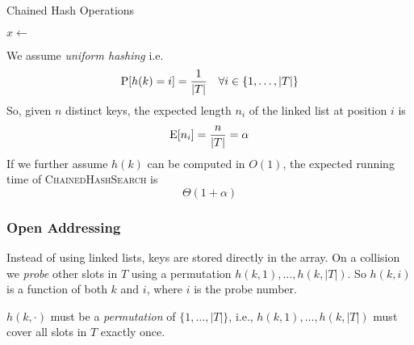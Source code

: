 \begin{figure}[htb]
\end{figure}



\begin{algorithm}[htb]
  \caption{Chained Hash Operations}
  \label{alg:chained_hash}
  \begin{algorithmic}[1]
      \State {}
    \EndFunction
      \State \Return {}
    \EndFunction
      \State $x \gets$ 
       \State {} \EndIf
    \EndFunction
  \end{algorithmic}
\end{algorithm}

We assume \emph{uniform hashing} i.e.
\[
\operatorname{P}[h(k) = i] = \frac{1}{|T|} \quad \forall i \in \{1,\dots,|T|\}
\]
So, given \(n\) distinct keys, the expected length \(n_i\) of the linked list at position \(i\) is
\[
\operatorname{E}[n_i] = \frac{n}{|T|} = \alpha
\]
If we further assume \(h(k)\) can be computed in \(O(1)\), the expected running time of \textsc{ChainedHashSearch} is
\[\boxed{
\Theta(1+\alpha)
}\]

\subsubsection{Open Addressing}

Instead of using linked lists, keys are stored directly in the array. 
On a collision we \emph{probe} other slots in \(T\) using a permutation \(h(k,1),\dots,h(k,|T|)\). 
So \(h(k,i)\) is a function of both \(k\) and \(i\), where \(i\) is the probe number.

\(h(k,\cdot)\) must be a \emph{permutation} of \(\{1,\dots,|T|\}\), i.e., \(h(k,1), \dots, h(k,|T|)\) must cover all slots in \(T\) exactly once.



